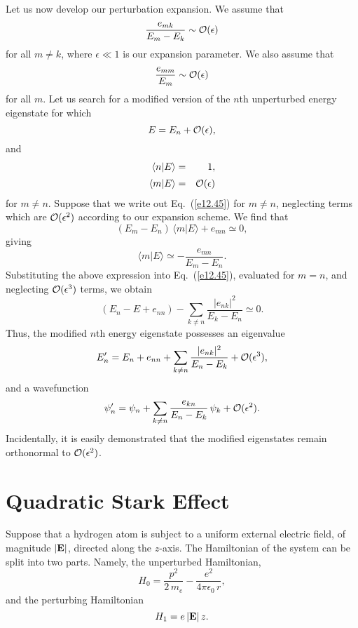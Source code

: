 Let us now develop our perturbation expansion. We assume that 
\begin{equation}
\frac{e_{mk}}{E_m-E_k} \sim {\cal O}(\epsilon)
\end{equation}
for all $m\neq k$, where $\epsilon\ll 1$ is our expansion parameter.
We also assume that
\begin{equation}
\frac{e_{mm}}{E_m}\sim {\cal O}(\epsilon)
\end{equation}
for all $m$. Let us search for a modified version of the $n$th unperturbed
energy eigenstate for which
\begin{equation}
E = E_n + {\cal O}(\epsilon),
\end{equation}
and
\begin{eqnarray}
\langle n|E\rangle &=& 1,\\[0.5ex]
\langle m|E\rangle&=&{\cal O}(\epsilon)
\end{eqnarray}
for $m\neq n$. Suppose that we write out Eq.~(\ref{e12.45}) for $m\neq n$,
neglecting terms which are ${\cal O}(\epsilon^2)$ according to our expansion
scheme. We find that
\begin{equation}
(E_m-E_n)\,\langle m|E\rangle + e_{mn} \simeq 0,
\end{equation}
giving
\begin{equation}
\langle m|E\rangle \simeq - \frac{e_{mn}}{E_m-E_n}.
\end{equation}
Substituting the above expression into Eq.~(\ref{e12.45}),
evaluated for $m=n$, and neglecting ${\cal O}(\epsilon^3)$ terms, we obtain
\begin{equation}
(E_n-E+e_{nn})-\sum_{k\neq n}\frac{|e_{nk}|^2}{E_k-E_n} \simeq 0.
\end{equation}
Thus, the modified $n$th energy eigenstate possesses an eigenvalue
\begin{equation}\label{e12.56}
E_n' = E_n + e_{nn} + \sum_{k\neq n}\frac{|e_{nk}|^2}{E_n-E_k}
+ {\cal O}(\epsilon^3),
\end{equation}
and a wavefunction
\begin{equation}\label{e12.57}
\psi_n' = \psi_n + \sum_{k\neq n} \frac{e_{kn}}{E_n-E_k}\,\psi_k + {\cal O}(\epsilon^2).
\end{equation}
Incidentally, it is easily demonstrated that the modified eigenstates remain orthonormal
to ${\cal O}(\epsilon^2)$. 

\section{Quadratic Stark Effect}\label{s12.5}
Suppose that a hydrogen atom is
subject to a uniform external electric field, of magnitude $|{\bf E}|$,  directed along the $z$-axis. The Hamiltonian of the system can be split into two parts. Namely, the unperturbed
Hamiltonian,
\begin{equation}\label{e12.58}
H_0 =\frac{p^2}{2\,m_e} -\frac{e^2}{4\pi\epsilon_0\,r},
\end{equation}
and the perturbing Hamiltonian
\begin{equation}
H_1 = e\,|{\bf E}|\,z.
\end{equation}

